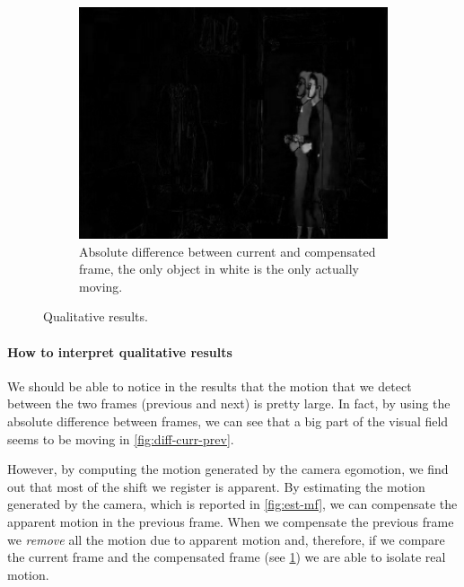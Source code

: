 \begin{figure}[htbp]
    \hfill
    \begin{subfigure}[b]{0.3\textwidth}
        \includegraphics[width=1\textwidth]{../assets/images/04-diff-curr-comp.png}
        \caption{Absolute difference between current and compensated frame, the only object in white is the only actually moving.}
        \label{fig:diff-curr-comp}
    \end{subfigure}

    \caption{Qualitative results.}
    \label{fig:qualitative-results}
\end{figure}

\paragraph{How to interpret qualitative results} We should be able to notice in the results that the motion that we detect between the two frames (previous and next) is pretty large. In fact, by using the absolute difference between frames, we can see that a big part of the visual field seems to be moving in \cref{fig:diff-curr-prev}.

However, by computing the motion generated by the camera egomotion, we find out that most of the shift we register is apparent.
By estimating the motion generated by the camera, which is reported in  \cref{fig:est-mf}, we can compensate the apparent motion in the previous frame.
When we compensate the previous frame we \textit{remove} all the motion due to apparent motion and, therefore, if we compare the current frame and the compensated frame (see \cref{fig:diff-curr-comp}) we are able to isolate real motion.

